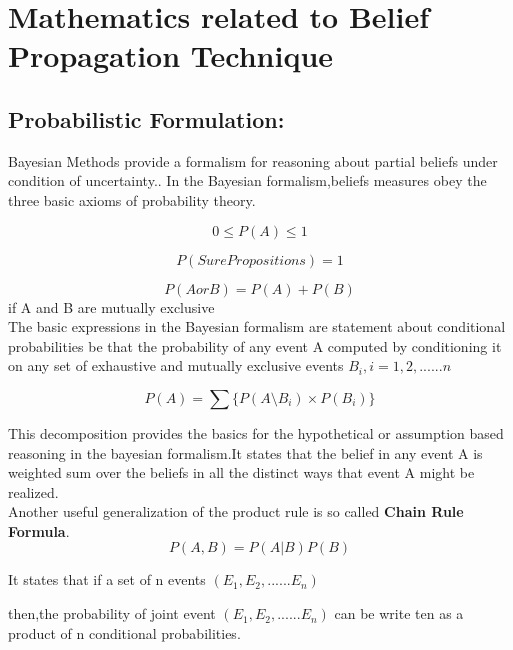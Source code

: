 \chapter{\textbf{Mathematics related to Belief Propagation Technique}}

\section{Probabilistic Formulation:}

Bayesian Methods provide a formalism for reasoning about partial beliefs under condition of uncertainty..
In the Bayesian formalism,beliefs measures obey the three basic axioms of probability theory.


\begin{equation*}
   0 \leq P(A) \leq 1
\end{equation*}

\begin{equation*}
    P(Sure Propositions)=1
\end{equation*}

\begin{equation*}
  P (A    or  B) = P(A)+ P(B)
\end{equation*}
 if A and B are mutually exclusive
\\The basic expressions in the Bayesian formalism are statement about conditional probabilities be that
the probability of any event A computed by conditioning it on any set of exhaustive and mutually exclusive events $B_i,i=1,2,......n$



\begin{equation*}
     P(A)= \sum \{P(A\setminus B_i)\times P(B_i)\}
\end{equation*}


This decomposition provides the basics for the hypothetical or assumption based reasoning in the bayesian formalism.It states that the belief in any event A is weighted sum over the beliefs in all the distinct  ways that event A might be realized.
\\ Another useful generalization of the product rule is so called \textbf{Chain Rule Formula}.
\begin{equation*}
P(A,B)=P(A|B)P(B)
\end{equation*}

It states that if  a set of n events $(E{_1},E{_2},......E{_n})$


then,the probability of joint event $(E_1,E{_2},......E{_n})$ can be write
ten as a product of n conditional probabilities.


